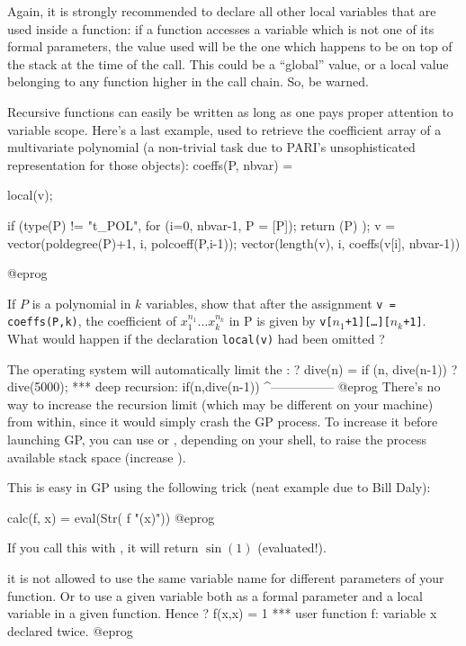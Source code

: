 Again, it is strongly recommended to declare all other local variables that
are used inside a function: if a function accesses a variable which is not
one of its formal parameters, the value used will be the one which happens to
be on top of the stack at the time of the call. This could be a ``global''
value, or a local value belonging to any function higher in the call chain.
So, be warned.

Recursive functions can easily be written as long as one
pays proper attention to variable scope. Here's a last example, used to
retrieve the coefficient array of a multivariate polynomial (a non-trivial
task due to PARI's unsophisticated representation for those objects):
\bprog
coeffs(P, nbvar) =
{
  local(v);

  if (type(P) != "t_POL",
    for (i=0, nbvar-1, P = [P]);
    return (P)
  );
  v = vector(poldegree(P)+1, i, polcoeff(P,i-1));
  vector(length(v), i, coeffs(v[i], nbvar-1))
}
@eprog

\noindent If $P$ is a polynomial in $k$ variables, show that after the
assignment {\tt v = coeffs(P,k)}, the coefficient of $x_1^{n_1}\dots
x_k^{n_k}$ in P is given by {\tt v[$n_1$+1][\dots][$n_k$+1]}. What would
happen if the declaration {\tt local(v)} had been omitted ?

The operating system will automatically limit the :
\bprog
? dive(n) = if (n, dive(n-1))
? dive(5000);
  ***   deep recursion: if(n,dive(n-1))
                        ^---------------
@eprog
There's no way to increase the recursion limit (which may be different on
your machine) from within, since it would simply crash the GP process. To
increase it before launching GP, you can use  or ,
depending on your shell, to raise the process available stack space
(increase ).

 This is easy
in GP using the following trick (neat example due to Bill Daly):

\bprog
calc(f, x) = eval(Str( f "(x)"))
@eprog

\noindent If you call this with , it will
return $\sin(1)$ (evaluated!).

 it is not allowed to use the same
variable name for different parameters of your function. Or to use a given
variable both as a formal parameter and a local variable in a given function.
Hence
\bprog
? f(x,x) = 1
  ***   user function f: variable x declared twice.
@eprog

